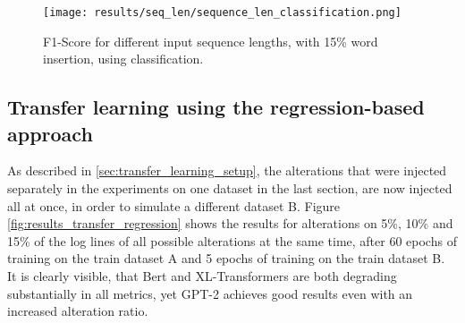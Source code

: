 \begin{figure}[h]
  \centering
  \texttt{[image: results/seq\_len/sequence\_len\_classification.png]}\\
  \caption{F1-Score for different input sequence lengths, with 15\% word insertion, using classification.}
  \label{fig:seq_len_classification}
\end{figure}





\subsection{Transfer learning using the regression-based approach \label{sec:results-regression-transfer}}

As described in \ref{sec:transfer_learning_setup}, the alterations that were injected separately in the experiments on one dataset in the last section, are now injected all at once, in order to simulate a different dataset B. Figure \ref{fig:results_transfer_regression} shows the results for alterations on 5\%, 10\% and 15\% of the log lines of all possible alterations at the same time, after 60 epochs of training on the train dataset A and 5 epochs of training on the train dataset B. It is clearly visible, that Bert and XL-Transformers are both degrading substantially in all metrics, yet GPT-2 achieves good results even with an increased alteration ratio.

\begin{comment}
\begin{figure}[h]
  \centering
  \texttt{[image: results/transfer/transfer\_regression\_reverse.png]}\\
  \caption{Scores for detecting reversed order of log events for transfer learning, using regression.}
  \label{fig:regression_transfer_reverse}
\end{figure}
\end{comment}


